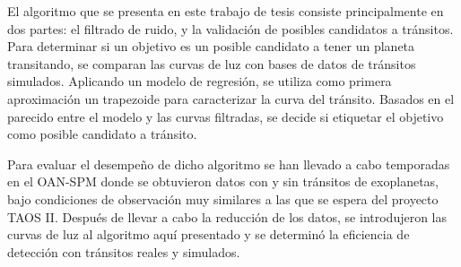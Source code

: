 El algoritmo que se presenta en este trabajo de tesis consiste principalmente en dos partes: el filtrado de ruido, y la validación de posibles candidatos a tránsitos. Para determinar si un objetivo es un posible candidato a tener un planeta transitando, se comparan las curvas de luz con bases de datos de tránsitos simulados. Aplicando un modelo de regresión, se utiliza como primera aproximación un trapezoide para caracterizar la curva del tránsito. Basados en el parecido entre el modelo y las curvas filtradas, se decide si etiquetar el objetivo como posible candidato a tránsito.

Para evaluar el desempeño de dicho algoritmo se han llevado a cabo temporadas en el OAN-SPM donde se obtuvieron datos con y sin tránsitos de exoplanetas, bajo condiciones de observación muy similares a las que se espera del proyecto TAOS II. Después de llevar a cabo la reducción de los datos, se introdujeron las curvas de luz al algoritmo aquí presentado y se determinó la eficiencia de detección con tránsitos reales y simulados.
